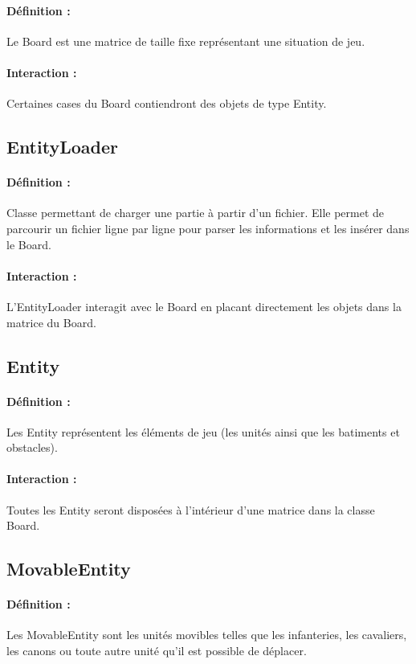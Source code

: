 			\paragraph{Définition :}
			Le Board est une matrice de taille fixe représentant une situation de jeu.
			\paragraph{Interaction :}
			Certaines cases du Board contiendront des objets de type Entity.
			

		\subsection*{EntityLoader}

			\paragraph{Définition :}
			Classe permettant de charger une partie à partir d'un fichier.
			Elle permet de parcourir un fichier ligne par ligne pour parser les informations et les insérer dans le Board.
			\paragraph{Interaction :}
			L'EntityLoader interagit avec le Board en placant directement les objets dans la matrice du Board.

		\subsection*{Entity}

			\paragraph{Définition :}
			Les Entity représentent les éléments de jeu (les unités ainsi que les batiments et obstacles).
			\paragraph{Interaction :}
			Toutes les Entity seront disposées à l'intérieur d'une matrice dans la classe Board.

		\subsection*{MovableEntity}

			\paragraph{Définition :}
			Les MovableEntity sont les unités movibles telles que les infanteries, les cavaliers, les canons ou toute autre unité 
			qu'il est possible de déplacer.
